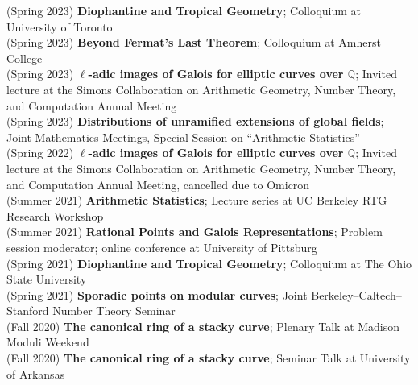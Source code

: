 \documentclass[margin,line]{res}
\begin{document}
\begin{resume}
(Spring 2023) \textbf{Diophantine and Tropical Geometry};
Colloquium at University of Toronto
\vspace{.05cm}\\  
(Spring 2023) \textbf{Beyond Fermat's Last Theorem};
Colloquium at Amherst College
\vspace{.05cm}\\  
(Spring 2023) \textbf{$\ell$-adic images of Galois for elliptic curves over $\mathbb{Q}$};
Invited lecture at  the Simons Collaboration on Arithmetic Geometry, Number Theory, and Computation Annual Meeting
\vspace{.05cm}\\
(Spring 2023) \textbf{Distributions of unramified extensions of global fields};
Joint Mathematics Meetings, Special Session on ``Arithmetic Statistics''
\vspace{.05cm}\\
(Spring 2022) \textbf{$\ell$-adic images of Galois for elliptic curves over $\mathbb{Q}$};
Invited lecture at  the Simons Collaboration on Arithmetic Geometry, Number Theory, and Computation Annual Meeting, cancelled due to Omicron
\vspace{.05cm}\\
(Summer 2021) \textbf{Arithmetic Statistics};
Lecture series at UC Berkeley RTG Research Workshop
\vspace{.05cm}\\
(Summer 2021) \textbf{Rational Points and Galois Representations};
Problem session moderator; online conference at University of Pittsburg
\vspace{.05cm}\\
(Spring 2021) \textbf{Diophantine and Tropical Geometry};
Colloquium at The Ohio State University 
\vspace{.05cm}\\
(Spring 2021) \textbf{Sporadic points on modular curves};
Joint Berkeley--Caltech--Stanford Number Theory Seminar
\vspace{.05cm}\\
(Fall 2020) \textbf{The canonical ring of a stacky curve};  
Plenary Talk at Madison Moduli Weekend 
\vspace{.05cm}\\
(Fall 2020) \textbf{The canonical ring of a stacky curve};  
Seminar Talk at University of Arkansas
\vspace{.05cm}\\

\end{resume}
\end{document}
